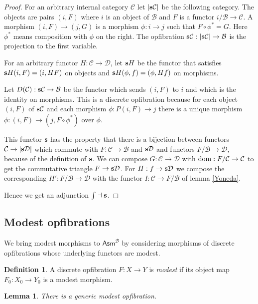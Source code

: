 \documentclass{amsart}
\theoremstyle{plain}
\newtheorem{lemma}[theorem]{Lemma}
\theoremstyle{definition}
\newtheorem{defin}[theorem]{Definition}
\newcommand\cat\mathcal
\newcommand\ri{^*}
\newcommand\Asm{\mathsf{Asm}}
\begin{document}
\begin{proof} For an arbitrary internal category $\cat C$ let $|\rat\cat C|$ be the following category. The objects are pairs $(i,F)$ where $i$ is an object of $\cat B$ and $F$ is a functor $i/\cat B \to \cat C$. A morphism $(i,F) \to (j,G)$ is a morphism $\phi:i\to j$ such that $F\circ \phi\ri = G$. Here $\phi\ri$ means composition with $\phi$ on the right. The opfibration $\rat\cat C:|\rat\cat C|\to\cat B$ is the projection to the first variable. %

For an arbitrary functor $H:\cat C \to \cat D$, let $\mathbf{s} H$ be the functor that satisfies $\mathbf{s} H(i,F) = (i,HF)$ on objects and $\mathbf{s} H(\phi,f)=(\phi,Hf)$ on morphisms.

Let $D(\cat C):\rat\cat C \to\cat B$ be the functor which sends $(i,F)$ to $i$ and which is the identity on morphisms. This is a discrete opfibration because for each object $(i,F)$ of $\rat\cat C$ and each morphism $\phi:P(i,F) \to j$ there is a unique morphism $\phi:(i,F) \to (j,F\circ \phi\ri)$ over $\phi$.

This functor $\mathbf{s}$ has the property that there is a bijection between functors $\cat C\to|\rat\cat D|$ which commute with $F:\cat C\to\cat B$ and $\rat \cat D$ and functors $F/\cat B\to \cat D$, because of the definition of $\mathbf{s}$. We can compose $G:\cat C\to\cat D$ with $\dom:F/\cat C \to \cat C$ to get the commutative triangle $F\to \rat \cat D$. For $H:f\to\rat \cat D$ we compose the corresponding $H':F/\cat B \to \cat D$ with the functor $I:\cat C\to F/\cat B$ of lemma \ref{Yoneda}.

Hence we get an adjunction $\mathord{\int}\dashv\mathbf{s}$.
\end{proof}

\subsection{Modest opfibrations}
We bring modest morphisms to $\Asm^{\cat B}$ by considering morphisms of discrete opfibrations whose underlying functors are modest.

\begin{defin} A discrete opfibration $F:X\to Y$ is \emph{modest} if its object map $F_0:X_0\to Y_0$ is a modest morphism. \end{defin}

\begin{lemma} There is a generic modest opfibration. \end{lemma}
\end{document}
